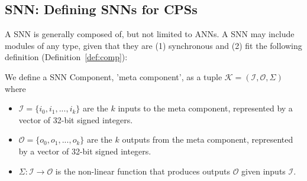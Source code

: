\subsection{\ac{SNN}: Defining \acp{SNN} for \acp{CPS}}
A \acf{SNN} is generally composed of, but not limited to \acp{ANN}.
A \ac{SNN} may include modules of any type, given that they are (1) synchronous and (2) fit the following definition (Definition~\ref{def:comp}):
\begin{definition}
	\label{def:comp}
	We define a \ac{SNN} Component, 'meta component', as a tuple $\mathcal{K} = (\mathcal{I}, \mathcal{O}, \Sigma)$ where
	\begin{itemize}
		\item $\mathcal{I} = \{i_0, i_1, ..., i_k \}$ are the $k$ inputs to the meta component, represented by a vector of 32-bit signed integers.
		\item $\mathcal{O} = \{o_0, o_1, ..., o_k \}$ are the $k$ outputs from the meta component, represented by a vector of 32-bit signed integers.
		\item $\Sigma: \mathcal{I} \rightarrow \mathcal{O}$ is the non-linear function that produces outputs $\mathcal{O}$ given inputs $\mathcal{I}$. 
	\end{itemize}
\end{definition}

